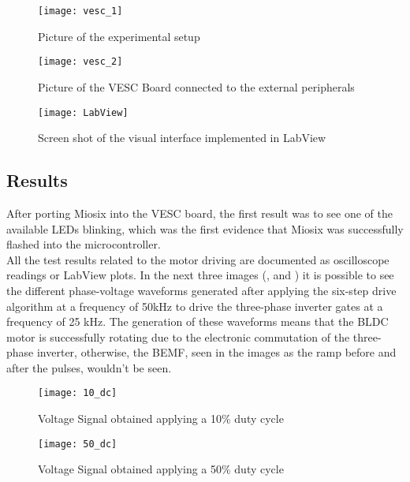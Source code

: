 \begin{figure} [H]
\centering\texttt{[image: vesc\_1]}
\caption{Picture of the experimental setup}
\label{fig:VESC_1}
\end{figure}

\begin{figure} [H]
\centering\texttt{[image: vesc\_2]}
\caption{Picture of the VESC Board connected to the external peripherals}
\label{fig:VESC_2}
\end{figure}

\begin{figure} [H]
\centering\texttt{[image: LabView]}
\caption{Screen shot of the visual interface implemented in LabView}
\label{fig:LabView}
\end{figure}

\subsection{Results}

After porting Miosix into the VESC board, the first result was to see one of the available LEDs blinking, which was the first evidence that Miosix was successfully flashed into the microcontroller.\\

All the test results related to the motor driving are documented as oscilloscope readings or LabView plots. In the next three images (,  and ) it is possible to see the different phase-voltage waveforms generated after applying the six-step drive algorithm at a frequency of 50kHz to drive the three-phase inverter gates at a frequency of 25 kHz. The generation of these waveforms means that the BLDC motor is successfully rotating due to the electronic commutation of the three-phase inverter, otherwise, the BEMF, seen in the images as the ramp before and after the pulses, wouldn't be seen.

\begin{figure} [H]
\centering\texttt{[image: 10\_dc]}
\caption{Voltage Signal obtained applying a 10\% duty cycle}
\label{fig:dutycycle_10}
\end{figure}

\begin{figure} [H]
\centering\texttt{[image: 50\_dc]}
\caption{Voltage Signal obtained applying a 50\% duty cycle}
\label{fig:dutycycle_50}
\end{figure}

